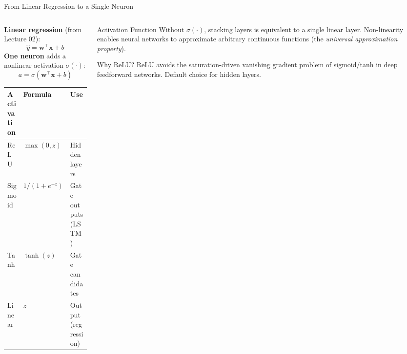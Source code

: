 \documentclass[aspectratio=169, 10pt]{beamer}
\begin{document}

\begin{frame}{From Linear Regression to a Single Neuron}
  \begin{columns}[T]
    \begin{column}{0.52\textwidth}
      \textbf{Linear regression} (from Lecture 02):
      \[
        \hat{y} = \mathbf{w}^\top \mathbf{x} + b
      \]
      \textbf{One neuron} adds a nonlinear activation $\sigma(\cdot)$:
      \[
        a = \sigma(\mathbf{w}^\top \mathbf{x} + b)
      \]

      \smallskip
      \begin{center}
      \footnotesize
      \begin{tabular}{lll}
        \toprule
        \textbf{Activation} & \textbf{Formula} & \textbf{Use} \\
        \midrule
        ReLU   & $\max(0,z)$           & Hidden layers \\
        Sigmoid & $1/(1+e^{-z})$       & Gate outputs (LSTM) \\
        Tanh   & $\tanh(z)$            & Gate candidates \\
        Linear & $z$                   & Output (regression) \\
        \bottomrule
      \end{tabular}
      \end{center}
    \end{column}
    \begin{column}{0.44\textwidth}
      \begin{definitionbox}{Activation Function}
        \footnotesize
        Without $\sigma(\cdot)$, stacking layers is equivalent to a single
        linear layer. Non-linearity enables neural networks to approximate
        arbitrary continuous functions (the \emph{universal approximation
        property}).
      \end{definitionbox}

      \smallskip
      \begin{examplebox}{Why ReLU?}
        \footnotesize
        ReLU avoids the saturation-driven vanishing gradient problem of
        sigmoid/tanh in deep feedforward networks.
        Default choice for hidden layers.
      \end{examplebox}
    \end{column}
  \end{columns}
\end{frame}
\end{document}
